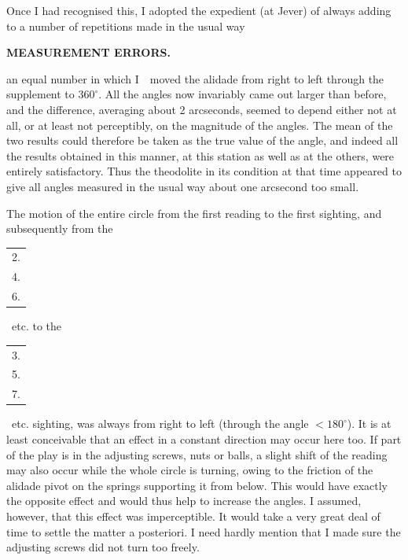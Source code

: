 \par\noindent\hspace*{\parindent}Once I had recognised this, I adopted the expedient (at Jever) of always adding to a number of repetitions made in the usual way

\par\clearpage
\noindent\null\hfill{\small\textbf{MEASUREMENT ERRORS.}}\hfill{}\par\medskip
\noindent an equal number in which I\ \ moved the alidade from right to left through the supplement to $360^\circ$. All the angles now invariably came out larger than before, and the difference, averaging about 2 arcseconds, seemed to depend either not at all, or at least not perceptibly, on the magnitude of the angles. The mean of the two results could therefore be taken as the true value of the angle, and indeed all the results obtained in this manner, at this station as well as at the others, were entirely satisfactory. Thus the theodolite in its condition at that time appeared to give all angles measured in the usual way about one arcsecond too small.

\par\noindent\hspace*{\parindent}The motion of the entire circle from the first reading to the first\linebreak
sighting, and subsequently from the \begin{tabular}[c]{@{}c@{}}2.\\4.\\6.\end{tabular}\ etc. to the \begin{tabular}[c]{@{}c@{}}3.\\5.\\7.\end{tabular}\ etc. sighting, was always from\linebreak
right to left (through the angle $<180^\circ$). It is at least conceivable that an effect in a constant direction may occur here too. If part of the play is in the adjusting screws, nuts or balls, a slight shift of the reading may also occur while the whole circle is turning, owing to the friction of the alidade pivot on the springs supporting it from below. This would have exactly the opposite effect and would thus help to increase the angles. I assumed, however, that this effect was imperceptible. It would take a very great deal of time to settle the matter a posteriori. I need hardly mention that I  made sure the adjusting screws did not turn too freely.

